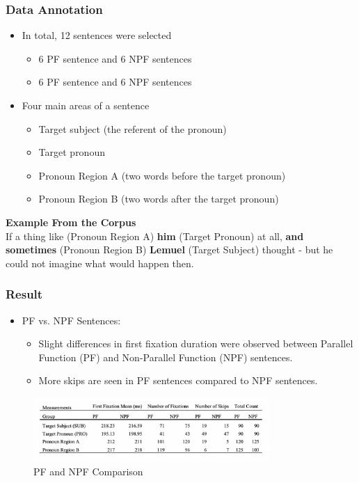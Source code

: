 \documentclass{beamer}
\begin{document}
\begin{frame}
\frametitle{Data Annotation}
\begin{itemize}
    \item In total, 12 sentences were selected
         \begin{itemize}
         \item 6 PF sentence and 6 NPF sentences
         \item 6 PF sentence and 6 NPF sentences
         \end{itemize}
    \item Four main areas of a sentence
     \begin{itemize}
        \item Target subject (the referent of the pronoun)
       \item  Target pronoun
       \item  Pronoun Region A (two words before the target pronoun)
       \item  Pronoun Region B (two words after the target pronoun)
      \end{itemize}
\end{itemize}
\textbf{Example From the Corpus}\\
If a thing like {} (Pronoun Region A) \textbf{him} (Target Pronoun) at all, \textbf{and sometimes} (Pronoun Region B) \textbf{Lemuel} (Target Subject) thought - but he could not imagine what would happen then.
\end{frame}


\begin{frame}
\frametitle{Result}
\begin{itemize}
    \item PF vs. NPF Sentences:
\begin{itemize}
    \item Slight differences in first fixation duration were observed between Parallel Function (PF) and Non-Parallel Function (NPF) sentences.
    \item More skips are seen in PF sentences compared to NPF sentences.
\end{itemize}
\end{itemize}
\begin{figure}
    \centering
    \includegraphics[width=9cm,keepaspectratio]{figures/first_fixation.png}
    \caption{PF and NPF Comparison}
    \label{table:PF and NPF Comparison}
\end{figure}
\end{frame}
\end{document}

